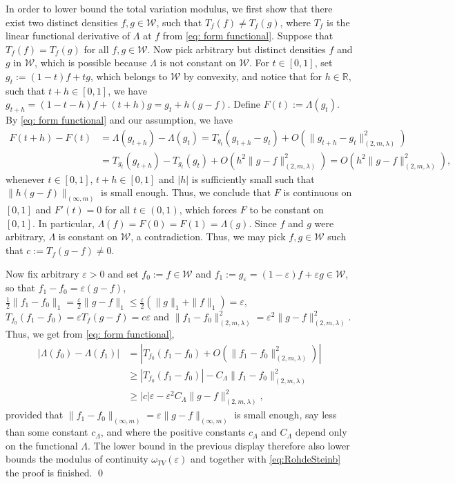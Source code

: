 \documentclass[preprint]{imsart}
\newcommand{\R}{{\mathbb R}}
\newcommand{\eps}{\varepsilon}
\numberwithin{equation}{section}
\begin{document}
\begin{appendix}
In order to lower bound the total variation modulus, we first show that there exist two distinct densities $f,g\in\mathcal W$, such that $T_{f}(f) \neq T_{f}(g)$, where $T_{f}$ is the linear functional derivative of $\Lambda$ at $f$ from \eqref{eq: form functional}. Suppose that $T_{f}(f) = T_{f}(g)$ for all $f,g\in\mathcal W$. Now pick arbitrary but distinct densities $f$ and $g$ in $\mathcal W$, which is possible because $\Lambda$ is not constant on $\mathcal W$. For $t\in[0,1]$, set $g_t := (1-t)f + tg$, which belongs to $\mathcal W$ by convexity, and notice that for $h\in\R$, such that $t+h\in[0,1]$, we have $g_{t+h} = (1-t-h)f + (t+h)g = g_t + h(g-f)$. Define $F(t) := \Lambda(g_t)$. By \eqref{eq: form functional} and our assumption, we have
\begin{align*}
F(t+h) - F(t) &= \Lambda(g_{t+h}) - \Lambda(g_t) 
= T_{g_t}(g_{t+h}-g_t) + O(\|g_{t+h}-g_t\|_{(2,m,\lambda)}^2)\\
&=
T_{g_t}(g_{t+h}) - T_{g_t}(g_t) + 
O(h^2\|g-f\|_{(2,m,\lambda)}^2) = O(h^2\|g-f\|_{(2,m,\lambda)}^2), 
\end{align*}
whenever $t\in[0,1]$, $t+h\in[0,1]$ and $|h|$ is sufficiently small such that $\|h(g-f)\|_{(\infty,m)}$ is small enough. Thus, we conclude that $F$ is continuous on $[0,1]$ and $F'(t) = 0$ for all $t\in(0,1)$, which forces $F$ to be constant on $[0,1]$. In particular, $\Lambda(f) = F(0) = F(1) = \Lambda(g)$. Since $f$ and $g$ were arbitrary, $\Lambda$ is constant on $\mathcal W$, a contradiction. Thus, we may pick $f,g\in\mathcal W$ such that $c:=T_f(g-f)\neq0$.

Now fix arbitrary $\eps>0$ and set $f_0:=f\in\mathcal W$ and $f_1 := g_\eps = (1-\eps)f + \eps g \in\mathcal W$, so that $f_1-f_0 = \eps(g-f)$, $\frac12\|f_1-f_0\|_1 = \frac{\eps}{2}\|g-f\|_1 \le \frac{\eps}{2}(\|g\|_1+\|f\|_1) = \eps$, $T_{f_0}(f_1-f_0) = \eps T_{f}(g-f) = c\eps$ and $\|f_1-f_0\|^2_{(2,m,\lambda)} = \eps^2 \|g-f\|^2_{(2,m,\lambda)}$. Thus, we get from \eqref{eq: form functional},
\begin{align*}
    |\Lambda(f_0)-\Lambda(f_1)| 
    &= |T_{f_0}(f_1-f_0) + O(\|f_1-f_0\|^2_{(2,m,\lambda)})|\\
    &\ge |T_{f_0}(f_1-f_0)| - C_\Lambda\|f_1-f_0\|^2_{(2,m,\lambda)} \\
    &\ge |c|\eps - \eps^2 C_\Lambda\|g-f\|^2_{(2,m,\lambda)},
\end{align*}
provided that $\|f_1-f_0\|_{(\infty,m)} = \eps \|g-f\|_{(\infty,m)}$ is small enough, say less than some constant $c_\Lambda$, and where the positive constants $c_\Lambda$ and $C_\Lambda$ depend only on the functional $\Lambda$. The lower bound in the previous display therefore also lower bounds the modulus of continuity $\omega_{TV}(\eps)$ and together with \eqref{eq:RohdeSteinb} the proof is finished.
\hfill\qed



\end{appendix}
\end{document}
